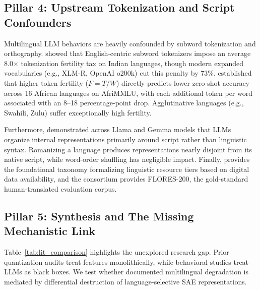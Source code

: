 \documentclass[11pt]{article}
\begin{document}
\subsection{Pillar 4: Upstream Tokenization and Script Confounders}
Multilingual LLM behaviors are heavily confounded by subword tokenization and orthography. \citet{srivastava2026tokenizer} showed that English-centric subword tokenizers impose an average 8.0$\times$ tokenization fertility tax on Indian languages, though modern expanded vocabularies (e.g., XLM-R, OpenAI o200k) cut this penalty by 73\%. \citet{lundin2026token} established that higher token fertility ($F = T/W$) directly predicts lower zero-shot accuracy across 16 African languages on AfriMMLU, with each additional token per word associated with an 8--18 percentage-point drop. Agglutinative languages (e.g., Swahili, Zulu) suffer exceptionally high fertility.

Furthermore, \citet{verma2026multilingual} demonstrated across Llama and Gemma models that LLMs organize internal representations primarily around script rather than linguistic syntax. Romanizing a language produces representations nearly disjoint from its native script, while word-order shuffling has negligible impact. Finally, \citet{joshi2020state} provides the foundational taxonomy formalizing linguistic resource tiers based on digital data availability, and the \citet{nllb2022no} consortium provides FLORES-200, the gold-standard human-translated evaluation corpus.

\subsection{Pillar 5: Synthesis and The Missing Mechanistic Link}
Table~\ref{tab:lit_comparison} highlights the unexplored research gap. Prior quantization audits treat features monolithically, while behavioral studies treat LLMs as black boxes. We test whether documented multilingual degradation is mediated by differential destruction of language-selective SAE representations.
\end{document}
